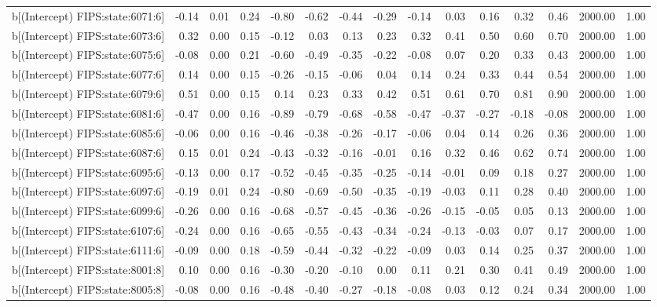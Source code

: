 \begin{table}[ht]
\begin{tabular}{rrrrrrrrrrrrrrr}
  b[(Intercept) FIPS:state:6071:6] & -0.14 & 0.01 & 0.24 & -0.80 & -0.62 & -0.44 & -0.29 & -0.14 & 0.03 & 0.16 & 0.32 & 0.46 & 2000.00 & 1.00 \\ 
  b[(Intercept) FIPS:state:6073:6] & 0.32 & 0.00 & 0.15 & -0.12 & 0.03 & 0.13 & 0.23 & 0.32 & 0.41 & 0.50 & 0.60 & 0.70 & 2000.00 & 1.00 \\ 
  b[(Intercept) FIPS:state:6075:6] & -0.08 & 0.00 & 0.21 & -0.60 & -0.49 & -0.35 & -0.22 & -0.08 & 0.07 & 0.20 & 0.33 & 0.43 & 2000.00 & 1.00 \\ 
  b[(Intercept) FIPS:state:6077:6] & 0.14 & 0.00 & 0.15 & -0.26 & -0.15 & -0.06 & 0.04 & 0.14 & 0.24 & 0.33 & 0.44 & 0.54 & 2000.00 & 1.00 \\ 
  b[(Intercept) FIPS:state:6079:6] & 0.51 & 0.00 & 0.15 & 0.14 & 0.23 & 0.33 & 0.42 & 0.51 & 0.61 & 0.70 & 0.81 & 0.90 & 2000.00 & 1.00 \\ 
  b[(Intercept) FIPS:state:6081:6] & -0.47 & 0.00 & 0.16 & -0.89 & -0.79 & -0.68 & -0.58 & -0.47 & -0.37 & -0.27 & -0.18 & -0.08 & 2000.00 & 1.00 \\ 
  b[(Intercept) FIPS:state:6085:6] & -0.06 & 0.00 & 0.16 & -0.46 & -0.38 & -0.26 & -0.17 & -0.06 & 0.04 & 0.14 & 0.26 & 0.36 & 2000.00 & 1.00 \\ 
  b[(Intercept) FIPS:state:6087:6] & 0.15 & 0.01 & 0.24 & -0.43 & -0.32 & -0.16 & -0.01 & 0.16 & 0.32 & 0.46 & 0.62 & 0.74 & 2000.00 & 1.00 \\ 
  b[(Intercept) FIPS:state:6095:6] & -0.13 & 0.00 & 0.17 & -0.52 & -0.45 & -0.35 & -0.25 & -0.14 & -0.01 & 0.09 & 0.18 & 0.27 & 2000.00 & 1.00 \\ 
  b[(Intercept) FIPS:state:6097:6] & -0.19 & 0.01 & 0.24 & -0.80 & -0.69 & -0.50 & -0.35 & -0.19 & -0.03 & 0.11 & 0.28 & 0.40 & 2000.00 & 1.00 \\ 
  b[(Intercept) FIPS:state:6099:6] & -0.26 & 0.00 & 0.16 & -0.68 & -0.57 & -0.45 & -0.36 & -0.26 & -0.15 & -0.05 & 0.05 & 0.13 & 2000.00 & 1.00 \\ 
  b[(Intercept) FIPS:state:6107:6] & -0.24 & 0.00 & 0.16 & -0.65 & -0.55 & -0.43 & -0.34 & -0.24 & -0.13 & -0.03 & 0.07 & 0.17 & 2000.00 & 1.00 \\ 
  b[(Intercept) FIPS:state:6111:6] & -0.09 & 0.00 & 0.18 & -0.59 & -0.44 & -0.32 & -0.22 & -0.09 & 0.03 & 0.14 & 0.25 & 0.37 & 2000.00 & 1.00 \\ 
  b[(Intercept) FIPS:state:8001:8] & 0.10 & 0.00 & 0.16 & -0.30 & -0.20 & -0.10 & 0.00 & 0.11 & 0.21 & 0.30 & 0.41 & 0.49 & 2000.00 & 1.00 \\ 
  b[(Intercept) FIPS:state:8005:8] & -0.08 & 0.00 & 0.16 & -0.48 & -0.40 & -0.27 & -0.18 & -0.08 & 0.03 & 0.12 & 0.24 & 0.34 & 2000.00 & 1.00 \\ 

\end{tabular}
\end{table}

